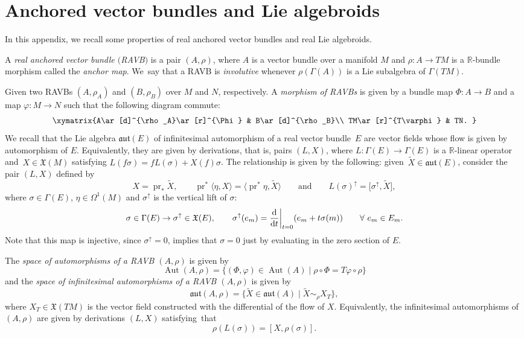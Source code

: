 \documentclass[pdftex]{sigma}
\numberwithin{equation}{section}
\newcommand{\R}{{\mathbb{R}}}
\newcommand{\X}{\mathfrak{X}}
\newcommand{\aut}{\mathfrak{aut}}
\DeclareMathOperator{\Aut}{Aut}
\DeclareMathOperator{\pr}{pr}
\begin{document}
\section{Anchored vector bundles and Lie algebroids}\label{preliminaries0}
In this appendix, we recall some properties of real anchored vector bundles and real Lie algebroids.
\begin{Definition}
   A {\em real anchored vector bundle $($RAVB$)$} is a pair $(A, \rho)$, where $A$ is a vector bundle over a manifold $M$ and $\rho\colon A\to TM$ is a $\R$-bundle morphism called the {\em anchor map}. We~say that a RAVB is {\em involutive} whenever $\rho(\Gamma(A))$ is a Lie subalgebra of $\Gamma(TM)$.
\end{Definition}
Given two RAVBs $(A,\rho_A)$ and $(B,\rho_B)$ over $M$ and $N$, respectively. A {\em morphism of RAVBs} is given by a bundle map $\Phi\colon A\to B$ and a map $\varphi\colon M\to N$ such that the following diagram commute:
\[\xymatrix{A\ar[d]^{\rho_A}\ar[r]^{\Phi} & B\ar[d]^{\rho_B}\\ TM\ar[r]^{T\varphi} & TN.
}\]
We recall that the Lie algebra $\mathfrak{aut}(E)$ of infinitesimal automorphism of a real vector bundle~$E$ are vector fields \smash{$\widetilde{X}\in \X(E)$} whose flow is given by automorphism of $E$. Equivalently, they are given by derivations, that is, pairs $(L,X)$, where $L\colon \Gamma(E)\to \Gamma(E)$ is a $\R$-linear operator and~${X\in \X(M)}$ satisfying $L(f\sigma)=fL(\sigma)+X(f)\sigma$. The relationship is given by the following: given~${\widetilde{X}\in \aut(E)}$, consider the pair $(L,X)$ defined by
\[
X=\pr_* \widetilde{X},\qquad \pr^*\langle \eta, X \rangle=\bigl\langle \pr^*\eta,\widetilde{X} \bigr\rangle\qquad \text{and}\qquad
L(\sigma)^{\uparrow}=\bigl[\sigma^{\uparrow},\widetilde{X}\bigr],
\]
where $\sigma\in \Gamma(E)$, $\eta\in \Omega^{1}(M)$ and $\sigma^{\uparrow}$ is the vertical lift of $\sigma$:
\begin{align*}
   \sigma\in \Gamma(E)\to \sigma^{\uparrow}\in\X(E),\qquad
 \sigma^{\uparrow}(e_m)=\frac{{\rm d}}{{\rm d}t}\bigg\rvert_{t=0}(e_m+t\sigma(m))\qquad\forall\ e_m\in E_m.
 \end{align*}
 Note that this map is injective, since $\sigma^{\uparrow}=0$, implies that $\sigma=0$ just by evaluating in the zero section of $E$.

 The {\em space of automorphisms of a RAVB $(A,\rho)$} is given by
 \[\Aut(A,\rho)=\{(\Phi, \varphi)\in \Aut(A)\mid \rho\circ\Phi=T\varphi\circ \rho\}\]
 and the {\em space of infinitesimal automorphisms of a RAVB $(A,\rho)$} is given by
 \[\mathfrak{aut}(A,\rho)=\big\{ \widetilde{X}\in \aut(A)\mid \widetilde{X}\sim_{\rho} X_T \big\},\]
 where $X_T\in \X(TM)$ is the vector field constructed with the differential of the flow of $X$. Equivalently, the infinitesimal automorphisms of $(A,\rho)$ are given by derivations $(L,X)$ satisfying~that
 \[\rho(L(\sigma))=[X, \rho(\sigma)].\]
\end{document}
